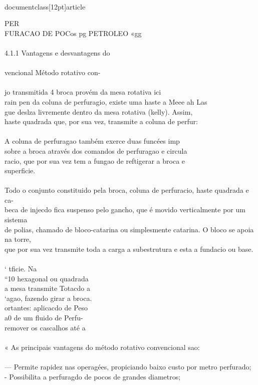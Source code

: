 \\documentclass[12pt]{article}
\begin{document}
{PER\\
FURACAO DE POCos pg PETROLEO «gg\\
\\
4.1.1 Vantagens e desvantagens do\\
\\
vencional Método rotativo con-\\
\\
jo transmitida 4 broca provém da mesa rotativa ici\\
rain pen da coluna de perfuragio, existe uma haste a Meee ah Las\\
gue deslza livremente dentro da mesa rotativa (kelly). Assim,\\
haste quadrada que, por sua vez, transmite a coluna de perfur:\\
\\
A coluna de perfuragao também exerce duas funcées imp\\
sobre a broca através dos comandos de perfuragao e circula\\
racio, que por sua vez tem a fungao de reftigerar a broca e\\
superficie.\\
\\
Todo o conjunto constituido pela broca, coluna de perfuracio, haste quadrada e ca-\\
beca de injecdo fica suspenso pelo gancho, que é movido verticalmente por um sistema\\
de polias, chamado de bloco-catarina ou simplesmente catarina. O bloco se apoia na torre,\\
que por sua vez transmite toda a carga a subestrutura e esta a fundacio ou base.\\
\\
‘ tficie. Na\\
“10 hexagonal ou quadrada\\
a mesa transmite Totacdo a\\
‘agao, fazendo girar a broca.\\
ortantes: aplicacdo de Peso\\
a0 de um fluido de Perfu-\\
remover os cascalhos até a\\
\\
« As principais vantagens do método rotativo convencional sao:\\
\\
— Permite rapidez nas operagées, propiciando baixo custo por metro perfurado;\\
- Possibilita a perfuragdo de pocos de grandes diametros;\\
}
\end{document}
